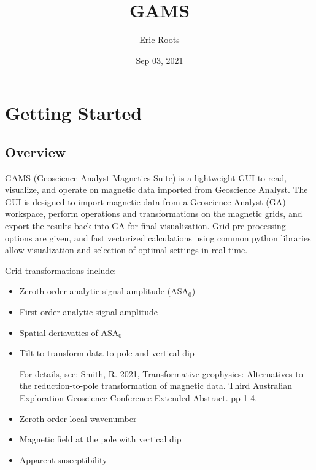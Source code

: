 \documentclass[letterpaper,10pt,english,openany,oneside]{sphinxmanual}
\title{GAMS}
\date{Sep 03, 2021}
\author{Eric Roots}
\begin{document}
\pagestyle{empty}
\sphinxmaketitle
\pagestyle{plain}
\sphinxtableofcontents
\pagestyle{normal}
\label{\detokenize{index::doc}}



\chapter{Getting Started}
\label{\detokenize{index:getting-started}}

\section{Overview}
\label{\detokenize{index:overview}}\label{\detokenize{content/getting_started/overview:overview}}
GAMS (Geoscience Analyst Magnetics Suite) is a lightweight GUI to read, visualize, and operate on magnetic data imported from Geoscience Analyst. The GUI is designed to import magnetic data from a Geoscience Analyst (GA) workspace, perform operations and transformations on the magnetic grids, and export the results back into GA for final visualization. Grid pre-processing options are given, and fast vectorized calculations using common python libraries allow visualization and selection of optimal settings in real time.

Grid transformations include:
\begin{itemize}
\item {} 
Zeroth-order analytic signal amplitude (ASA$_{\text{0}}$)

\item {} 
First-order analytic signal amplitude

\item {} 
Spatial deriavaties of ASA$_{\text{0}}$

\item {} 
Tilt to transform data to pole and vertical dip %
\begin{footnote}[1]\sphinxAtStartFootnote
For details, see: Smith, R. 2021, Transformative geophysics: Alternatives to the reduction-to-pole transformation of magnetic data. Third Australian Exploration Geoscience Conference Extended Abstract. pp 1-4.
%
\end{footnote}

\item {} 
Zeroth-order local wavenumber

\item {} 
Magnetic field at the pole with vertical dip \sphinxfootnotemark[1]

\item {} 
Apparent susceptibility \sphinxfootnotemark[1]

\end{itemize}
\end{document}
